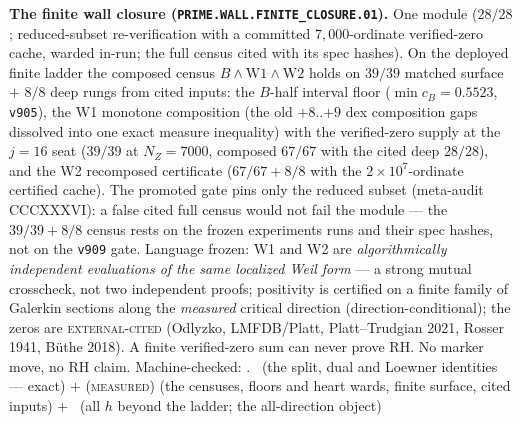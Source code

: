 \par\smallskip\noindent\textbf{The finite wall closure
(\texttt{PRIME.WALL.FINITE\_\allowbreak CLOSURE.01}).}
One module ($28/28$; reduced-subset re-verification with a
committed $7{,}000$-ordinate verified-zero cache, warded
in-run; the full census cited with its spec hashes).  On the
deployed finite ladder the composed census $B \wedge
\mathrm{W1} \wedge \mathrm{W2}$ holds on $39/39$ matched
surface $+$ $8/8$ deep rungs from cited inputs: the $B$-half
interval floor ($\min c_B = 0.5523$, \texttt{v905}), the W1
monotone composition (the old $+8$..$+9$ dex composition gaps
dissolved into one exact measure inequality) with the
verified-zero supply at the $j = 16$ seat ($39/39$ at
$N_Z = 7000$, composed $67/67$ with the cited deep $28/28$),
and the W2 recomposed certificate ($67/67 + 8/8$ with the
$2\times10^{7}$-ordinate certified cache).  The promoted gate
pins only the reduced subset (meta-audit CCCXXXVI): a false
cited full census would not fail the module --- the $39/39 +
8/8$ census rests on the frozen experiments runs and their spec
hashes, not on the \texttt{v909} gate.  Language frozen: W1
and W2 are \emph{algorithmically independent evaluations of the
same localized Weil form} --- a strong mutual crosscheck, not
two independent proofs; positivity is certified on a finite
family of Galerkin sections along the \emph{measured} critical
direction (direction-conditional); the zeros are
\textsc{external-cited} (Odlyzko, LMFDB/Platt, Platt--Trudgian
2021, Rosser 1941, B\"uthe 2018).  A finite verified-zero sum
can never prove RH.  No marker move, no RH claim.
Machine-checked: .
\mE\ (the split, dual and Loewner identities --- exact) $+$
(\textsc{measured}) (the censuses, floors and heart wards,
finite surface, cited inputs) $+$ \mO\ (all $h$ beyond the
ladder; the all-direction object)
\par\smallskip


